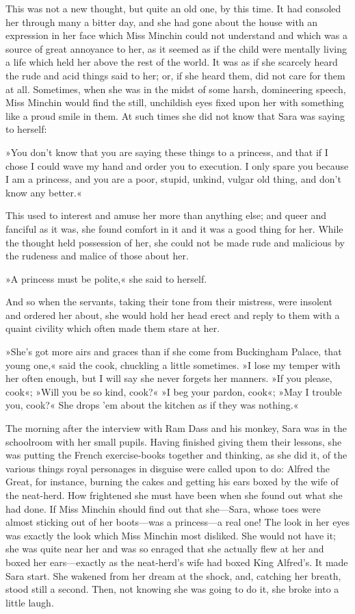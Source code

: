 This was not a new thought, but quite an old one, by this time. It had consoled her through many a bitter day, and she had gone about the house with an expression in her face which Miss Minchin could not understand and which was a source of great annoyance to her, as it seemed as if the child were mentally living a life which held her above the rest of the world. It was as if she scarcely heard the rude and acid things said to her; or, if she heard them, did not care for them at all. Sometimes, when she was in the midst of some harsh, domineering speech, Miss Minchin would find the still, unchildish eyes fixed upon her with something like a proud smile in them. At such times she did not know that Sara was saying to herself:

»You don't know that you are saying these things to a princess, and that if I chose I could wave my hand and order you to execution. I only spare you because I am a princess, and you are a poor, stupid, unkind, vulgar old thing, and don't know any better.«

This used to interest and amuse her more than anything else; and queer and fanciful as it was, she found comfort in it and it was a good thing for her. While the thought held possession of her, she could not be made rude and malicious by the rudeness and malice of those about her.

»A princess must be polite,« she said to herself.

And so when the servants, taking their tone from their mistress, were insolent and ordered her about, she would hold her head erect and reply to them with a quaint civility which often made them stare at her.

»She's got more airs and graces than if she come from Buckingham Palace, that young one,« said the cook, chuckling a little sometimes. »I lose my temper with her often enough, but I will say she never forgets her manners. »If you please, cook«; »Will you be so kind, cook?« »I beg your pardon, cook«; »May I trouble you, cook?« She drops 'em about the kitchen as if they was nothing.«

The morning after the interview with Ram Dass and his monkey, Sara was in the schoolroom with her small pupils. Having finished giving them their lessons, she was putting the French exercise-books together and thinking, as she did it, of the various things royal personages in disguise were called upon to do: Alfred the Great, for instance, burning the cakes and getting his ears boxed by the wife of the neat-herd. How frightened she must have been when she found out what she had done. If Miss Minchin should find out that she—Sara, whose toes were almost sticking out of her boots—was a princess—a real one! The look in her eyes was exactly the look which Miss Minchin most disliked. She would not have it; she was quite near her and was so enraged that she actually flew at her and boxed her ears—exactly as the neat-herd's wife had boxed King Alfred's. It made Sara start. She wakened from her dream at the shock, and, catching her breath, stood still a second. Then, not knowing she was going to do it, she broke into a little laugh.

